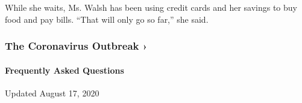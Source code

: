While she waits, Ms. Walsh has been using credit cards and her savings
to buy food and pay bills. ``That will only go so far,'' she said.

\href{https://www.nytimes3xbfgragh.onion/news-event/coronavirus?action=click\&pgtype=Article\&state=default\&region=MAIN_CONTENT_3\&context=storylines_faq}{}

\hypertarget{the-coronavirus-outbreak-}{%
\subsubsection{The Coronavirus Outbreak
›}\label{the-coronavirus-outbreak-}}

\hypertarget{frequently-asked-questions}{%
\paragraph{Frequently Asked
Questions}\label{frequently-asked-questions}}

Updated August 17, 2020

